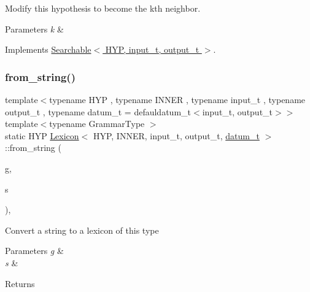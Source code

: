 Modify this hypothesis to become the k\textquotesingle{}th neighbor. 


\begin{DoxyParams}{Parameters}
{\em k} & \\
\hline
\end{DoxyParams}


Implements \hyperlink{class_searchable_a1786307b9f2dadc8c66c94adef220270}{Searchable$<$ H\+Y\+P, input\+\_\+t, output\+\_\+t $>$}.

\mbox{\label{class_lexicon_a9c9fd97a05a82e4f8b202850f8e8802c}} 
\subsubsection{\texorpdfstring{from\+\_\+string()}{from\_string()}}
{\footnotesize\ttfamily template$<$typename H\+YP , typename I\+N\+N\+ER , typename input\+\_\+t , typename output\+\_\+t , typename datum\+\_\+t  = defauldatum\+\_\+t$<$input\+\_\+t, output\+\_\+t$>$$>$ \\
template$<$typename Grammar\+Type $>$ \\
static H\+YP \hyperlink{class_lexicon}{Lexicon}$<$ H\+YP, I\+N\+N\+ER, input\+\_\+t, output\+\_\+t, \hyperlink{class_bayesable_a9f1a6c0cd7855550fa10b1a8f13a5867}{datum\+\_\+t} $>$\+::from\+\_\+string (\begin{DoxyParamCaption}\item[{Grammar\+Type \&}]{g,  }\item[{std\+::string}]{s }\end{DoxyParamCaption})\hspace{0.3cm}{\ttfamily [inline]}, {\ttfamily [static]}}

Convert a string to a lexicon of this type 
\begin{DoxyParams}{Parameters}
{\em g} & \\
\hline
{\em s} & \\
\hline
\end{DoxyParams}
\begin{DoxyReturn}{Returns}

\end{DoxyReturn}
\mbox{\label{class_lexicon_a7b8ca67607285cc14608bd7148953d91}} 
